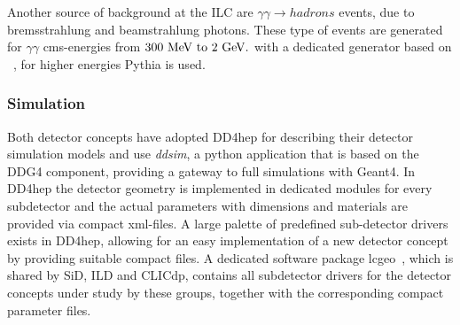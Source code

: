 Another source of background at the ILC are $\gamma \gamma \rightarrow hadrons$ events, due to bremsstrahlung and beamstrahlung photons.
These type of events are generated for $\gamma \gamma$ cms-energies from $300~\rm{MeV~to} ~2~\rm{GeV}.$ with a dedicated generator based
on ~\cite{Chen:1993dba}, for higher energies Pythia is used.


\subsubsection{Simulation}

Both detector concepts have adopted DD4hep for describing their detector simulation models and use \emph{ddsim}, a python application that
is based on the DDG4 component, providing a gateway to full simulations with Geant4.
In DD4hep the detector geometry is implemented in dedicated \CPP modules for every subdetector and the actual parameters with dimensions
and materials are provided via compact xml-files. A large palette of predefined sub-detector drivers exists in DD4hep, allowing for an
easy implementation of a new detector concept by providing suitable compact files.
A dedicated software package lcgeo~\cite{bib:lcgeo}, which is shared by SiD, ILD and CLICdp, contains all subdetector drivers for the
detector concepts under study by these groups, together with the corresponding compact parameter files.

